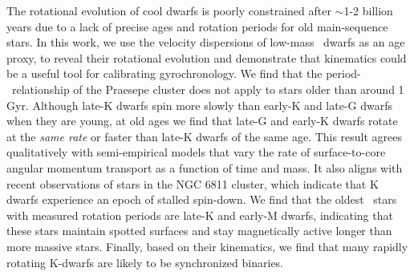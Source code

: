 
The rotational evolution of cool dwarfs is poorly constrained after $\sim$1-2
billion years due to a lack of precise ages and rotation periods for old
main-sequence stars.
In this work, we use the velocity dispersions of low-mass \kepler\ dwarfs as
an age proxy, to reveal their rotational evolution and demonstrate that
kinematics could be a useful tool for calibrating gyrochronology.
We find that the period-\teff\ relationship of the Praesepe cluster does not
apply to stars older than around 1 Gyr.
Although late-K dwarfs spin more slowly than early-K and late-G dwarfs when
they are young, at old ages we find that late-G and early-K dwarfs rotate at
the {\it same rate} or faster than late-K dwarfs of the same age.
This result agrees qualitatively with semi-empirical models that vary the rate
of surface-to-core angular momentum transport as a function of time and mass.
It also aligns with recent observations of stars in the NGC 6811 cluster,
which indicate that K dwarfs experience an epoch of stalled spin-down.
We find that the oldest \kepler\ stars with measured rotation periods are
late-K and early-M dwarfs, indicating that these stars maintain spotted
surfaces and stay magnetically active longer than more massive stars.
Finally, based on their kinematics, we find that many rapidly rotating
K-dwarfs are likely to be synchronized binaries.

